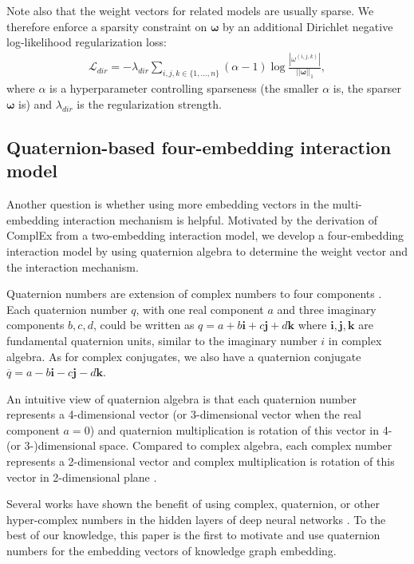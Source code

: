 \documentclass[sigconf,edbt]{acmart-edbt2019}
\def\vi{{\bm{i}}}
\def\vj{{\bm{j}}}
\def\vk{{\bm{k}}}
\def\gL{{\mathcal{L}}}
\begin{document}
Note also that the weight vectors for related models are usually sparse. We therefore enforce a sparsity constraint on $ \bm{\omega} $ by an additional Dirichlet negative log-likelihood regularization loss:
\begin{equation} \label{eq:dirichlet}
\begin{split}
\gL_{dir} = - \lambda_{dir} \sum_{i, j, k \in \{1, ..., n\}} (\alpha - 1) \log \frac{|\omega^{(i, j, k)}|}{||\bm{\omega}||_1},
\end{split}
\end{equation}
where $ \alpha $ is a hyperparameter controlling sparseness (the smaller $ \alpha $ is, the sparser $ \bm{\omega} $ is) and $ \lambda_{dir} $ is the regularization strength.


\subsection{Quaternion-based four-embedding interaction model}
Another question is whether using more embedding vectors in the multi-embedding interaction mechanism is helpful. Motivated by the derivation of ComplEx from a two-embedding interaction model, we develop a four-embedding interaction model by using quaternion algebra to determine the weight vector and the interaction mechanism.

Quaternion numbers are extension of complex numbers to four components \cite{kantor_hypercomplexnumberselementary_1989} \cite{goldman_rethinkingquaternions_2010}. Each quaternion number $ q $, with one real component $ a $ and three imaginary components $ b, c, d $, could be written as $ q = a + b \vi + c \vj + d \vk $ where $ \vi, \vj, \vk $ are fundamental quaternion units, similar to the imaginary number $ i $ in complex algebra. As for complex conjugates, we also have a quaternion conjugate $ \overline{q} = a - b \vi - c \vj - d \vk $.

An intuitive view of quaternion algebra is that each quaternion number represents a 4-dimensional vector (or 3-dimensional vector when the real component $ a = 0 $) and quaternion multiplication is rotation of this vector in 4- (or 3-)dimensional space. Compared to complex algebra, each complex number represents a 2-dimensional vector and complex multiplication is rotation of this vector in 2-dimensional plane \cite{ahlfors_complexanalysisintroduction_1953}.

Several works have shown the benefit of using complex, quaternion, or other hyper-complex numbers in the hidden layers of deep neural networks \cite{guberman_complexvaluedconvolutional_2016} \cite{minemoto_feedforwardneural_2017} \cite{parcollet_quaternionrecurrentneural_2019}. To the best of our knowledge, this paper is the first to motivate and use quaternion numbers for the embedding vectors of knowledge graph embedding.
\end{document}
